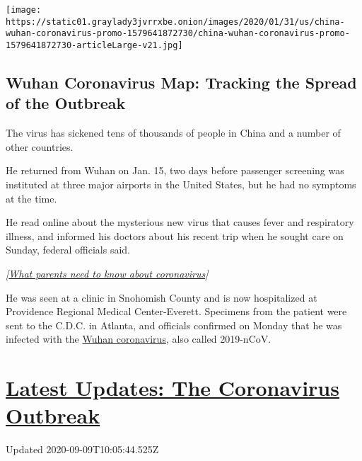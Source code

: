 \texttt{[image: https://static01.graylady3jvrrxbe.onion/images/2020/01/31/us/china-wuhan-coronavirus-promo-1579641872730/china-wuhan-coronavirus-promo-1579641872730-articleLarge-v21.jpg]}

\hypertarget{wuhan-coronavirus-map-tracking-the-spread-of-the-outbreak}{%
\subsection{Wuhan Coronavirus Map: Tracking the Spread of the
Outbreak}\label{wuhan-coronavirus-map-tracking-the-spread-of-the-outbreak}}

The virus has sickened tens of thousands of people in China and a number
of other countries.

He returned from Wuhan on Jan. 15, two days before passenger screening
was instituted at three major airports in the United States, but he had
no symptoms at the time.

He read online about the mysterious new virus that causes fever and
respiratory illness, and informed his doctors about his recent trip when
he sought care on Sunday, federal officials said.

\emph{{[}}\href{https://parenting.nytimes3xbfgragh.onion/childrens-health/coronavirus-children-pregnant-women}{\emph{What
parents need to know about coronavirus}}\emph{{]}}

He was seen at a clinic in Snohomish County and is now hospitalized at
Providence Regional Medical Center-Everett. Specimens from the patient
were sent to the C.D.C. in Atlanta, and officials confirmed on Monday
that he was infected with the
\href{https://www.nytimes3xbfgragh.onion/2020/01/24/health/chicago-coronavirus-cdc.html}{Wuhan
coronavirus}, also called 2019-nCoV.

\hypertarget{latest-updates-the-coronavirus-outbreak}{%
\section{\texorpdfstring{\href{https://www.nytimes3xbfgragh.onion/2020/09/09/world/covid-19-coronavirus.html?action=click\&pgtype=Article\&state=default\&region=MAIN_CONTENT_1\&context=storylines_live_updates}{Latest
Updates: The Coronavirus
Outbreak}}{Latest Updates: The Coronavirus Outbreak}}\label{latest-updates-the-coronavirus-outbreak}}

Updated 2020-09-09T10:05:44.525Z

